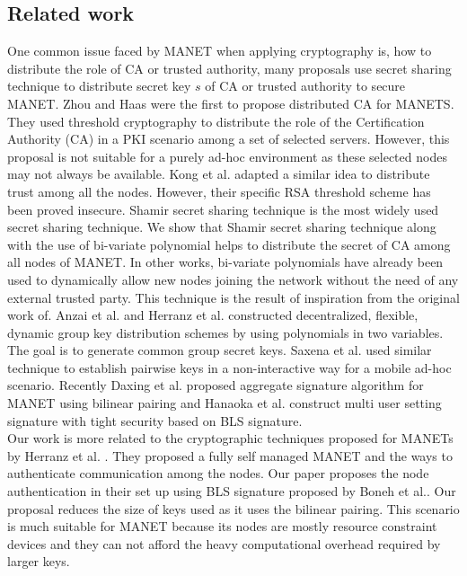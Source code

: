 \documentclass[11pt,a4paper]{llncs}
\begin{document}
\subsection{Related work}
One common issue faced by MANET when applying cryptography is, how to distribute the role of CA or trusted authority, many proposals use secret sharing technique to distribute secret key $s$ of CA or trusted authority to secure MANET. Zhou and Haas\cite{zhou} were the first to propose distributed CA for MANETS. They used threshold cryptography to distribute the role of the Certification Authority (CA) in a PKI scenario among a set of selected servers. However, this proposal is not suitable for a purely ad-hoc environment as these selected nodes may not always be available. Kong et al.\cite{kong} adapted a similar idea to distribute trust among all the nodes. However, their specific RSA threshold scheme has been proved insecure\cite{narasima}\cite{jarecki}. Shamir secret sharing technique\cite{shamir} is the most widely used secret sharing technique. We show that Shamir secret sharing technique along with the use of bi-variate polynomial helps to distribute the secret of CA among all nodes of MANET. In other works, bi-variate polynomials have already been used to dynamically allow new nodes joining the network without the need of any external trusted party. This technique is the result of inspiration from the original work of\cite{blundo}. Anzai et al.\cite{anzai} and Herranz et al.\cite{herranz} constructed decentralized, flexible, dynamic group key distribution schemes by using polynomials in two variables. The goal is to generate common group secret keys. Saxena et al.\cite{saxena} used similar technique to establish pairwise keys in a non-interactive way for a mobile ad-hoc scenario. Recently Daxing et al. \cite{Daxing} proposed aggregate signature algorithm for MANET using bilinear pairing and Hanaoka et al. \cite{Hanoka} construct multi user setting signature with tight security based on BLS signature.
\vspace{0.2cm} \\
Our work is more related to the cryptographic techniques proposed for MANETs by 
Herranz et al. \cite{herranz}. They proposed a fully self managed MANET and the ways to authenticate communication among the nodes. Our paper proposes the node authentication in their set up using BLS signature proposed by Boneh et al.\cite{bls}. Our proposal reduces the size of keys used as it uses the bilinear pairing. This scenario is much suitable for MANET because its nodes are mostly resource constraint devices and they can not afford the heavy computational overhead required by larger keys.
\end{document}
